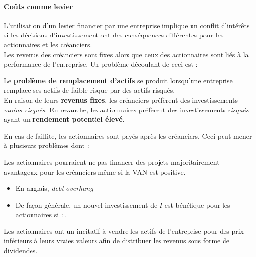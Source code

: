 \documentclass[10pt, french]{article}
\begin{document}
\begin{multicols*}{2}

\paragraph{Coûts comme levier}	L'utilisation d'un levier financier par une entreprise implique un conflit d'intérêts si les décisions d'investissement ont des conséquences différentes pour les actionnaires et les créanciers.	\\

Les revenus des créanciers sont fixes alors que ceux des actionnaires sont liés à la performance de l'entreprise. Un problème découlant de ceci est :

\begin{definitionNOHFILLprop}
Le \textbf{problème de remplacement d'actifs} se produit lorsqu'une entreprise remplace ses actifs de faible risque par des actifs risqués.	\\

En raison de leurs \textbf{revenus fixes}, les créanciers préfèrent des investissements \textit{moins risqués}. En revanche, les actionnaires préfèrent des investissements \textit{risqués} ayant un \textbf{rendement potentiel élevé}. 
\end{definitionNOHFILLprop}

En cas de faillite, les actionnaires sont payés après les créanciers. Ceci peut mener à plusieurs problèmes dont : 

\begin{definitionNOHFILLprop}
Les actionnaires pourraient ne pas financer des projets majoritairement avantageux pour les créanciers même si la VAN est positive. \\

\begin{itemize}
	\item	En anglais, \og \textit{debt overhang} \fg{} ;
	\item	De façon générale, un nouvel investissement de $I$ est bénéfique pour les actionnaires si : .	
\end{itemize}
\end{definitionNOHFILLprop}

\begin{definitionNOHFILLprop}
Les actionnaires ont un incitatif à vendre les actifs de l'entreprise pour des prix inférieurs à leurs vraies valeurs afin de distribuer les revenus sous forme de dividendes.
\end{definitionNOHFILLprop}



\end{multicols*}
\end{document}
